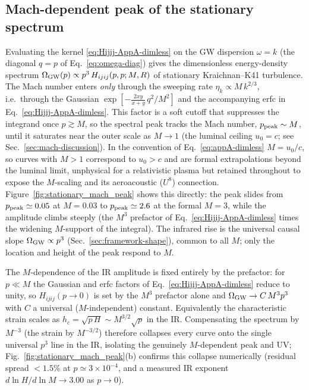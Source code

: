 \documentclass[10pt,prd,aps,nobibnotes,superscriptaddress,preprintnumbers,notitlepage]{revtex4-1}
\begin{document}
\subsection{Mach-dependent peak of the stationary spectrum}
\label{sec:kraichnan-mach-peak}

Evaluating the kernel \eqref{eq:Hijij-AppA-dimless} on the GW dispersion
$\omega=k$ (the diagonal $q=p$ of Eq.~\eqref{eq:omega-diag}) gives the
dimensionless energy-density spectrum
$\Omega_{\rm GW}(p)\propto p^3\,H_{ijij}(p,p;M,R)$ of stationary Kraichnan--K41
turbulence. The Mach number enters \emph{only} through the sweeping rate
$\eta_k\propto M\,k^{2/3}$, i.e.\ through the Gaussian
$\exp[-\tfrac{2xy}{x+y}\,q^2/M^2]$ and the accompanying erfc in
Eq.~\eqref{eq:Hijij-AppA-dimless}. This factor is a soft cutoff that suppresses
the integrand once $p\gtrsim M$, so the spectral peak tracks the Mach number,
$p_{\rm peak}\sim M$, until it saturates near the outer scale as $M\to1$ (the
luminal ceiling $u_0=c$; see Sec.~\ref{sec:mach-discussion}). In the convention
of Eq.~\eqref{eq:appA-dimless} $M=u_0/c$, so curves with $M>1$ correspond to
$u_0>c$ and are formal extrapolations beyond the luminal limit, unphysical for a
relativistic plasma but retained throughout to expose the $M$-scaling and its
aeroacoustic ($U^8$) connection.
Figure~\ref{fig:stationary_mach_peak} shows this directly: the peak slides from
$p_{\rm peak}\simeq0.05$ at $M=0.03$ to $p_{\rm peak}\simeq2.6$ at the formal
$M=3$, while the amplitude climbs steeply (the $M^3$ prefactor of
Eq.~\eqref{eq:Hijij-AppA-dimless} times the widening $M$-support of the
integral). The infrared rise is the universal causal slope
$\Omega_{\rm GW}\propto p^3$ (Sec.~\ref{sec:framework-shape}), common to all $M$;
only the location and height of the peak respond to $M$.

The $M$-dependence of the IR amplitude is fixed entirely by the prefactor: for
$p\ll M$ the Gaussian and erfc factors of Eq.~\eqref{eq:Hijij-AppA-dimless}
reduce to unity, so $H_{ijij}(p\to0)$ is set by the $M^3$ prefactor alone and
$\Omega_{\rm GW}\to C\,M^3 p^3$ with $C$ a universal ($M$-independent) constant.
Equivalently the characteristic strain scales as $h_c=\sqrt{p\,H}\sim M^{3/2}\sqrt p$
in the IR. Compensating the spectrum by $M^{-3}$ (the strain by $M^{-3/2}$)
therefore collapses every curve onto the single universal $p^3$ line in the IR,
isolating the genuinely $M$-dependent peak and UV; Fig.~\ref{fig:stationary_mach_peak}(b)
confirms this collapse numerically (residual spread $<1.5\%$ at $p\simeq3\times10^{-4}$,
and a measured IR exponent $d\ln H/d\ln M\to3.00$ as $p\to0$).
\end{document}
